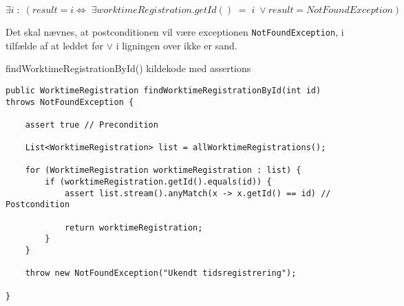 \begin{equation}
    \exists i\; :\; (result = i \iff\; \exists worktimeRegistration.getId() \; = \; i\; \lor result = NotFoundException)
\end{equation}\label{postcondition 1}
\vspace{4pt}

Det skal nævnes, at postconditionen vil være exceptionen \texttt{NotFoundException}, i tilfælde af at leddet før $\lor$ i ligningen over ikke er sand.


\begin{listing}[H]
    \centering
    \caption{findWorktimeRegistrationById() kildekode med assertions}\label{lst:find_work_time_registration_by_id_assertions}
    \begin{verbatim}
public WorktimeRegistration findWorktimeRegistrationById(int id) throws NotFoundException {

    assert true // Precondition
    
    List<WorktimeRegistration> list = allWorktimeRegistrations();

    for (WorktimeRegistration worktimeRegistration : list) {
        if (worktimeRegistration.getId().equals(id)) {
            assert list.stream().anyMatch(x -> x.getId() == id) // Postcondition
            
            return worktimeRegistration;
        }
    }

    throw new NotFoundException("Ukendt tidsregistrering");

}
    \end{verbatim}
\end{listing}


